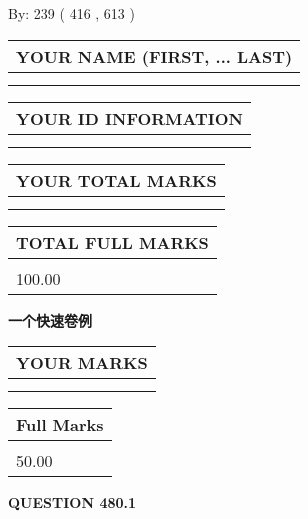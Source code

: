 \documentclass{ctexart}
\begin{document}
   
\hspace{1.0in} By: 
 239 ( 416 ,  613 )
   
   
   
   
\newpage 
\setcounter{page}{ 
   480001 } 
   
   
   
   
\noindent\begin{tabular}{|l|}
\hline
YOUR NAME (FIRST, ... LAST)  \\
\hline
 \\ 
 \\ 
\hline
\end{tabular}
\hspace{0.05in} \begin{tabular}{|l|}
\hline
 YOUR   ID   INFORMATION  \\
\hline
 \\ 
 \\ 
\hline
\end{tabular}
   
   
\vspace{0.2in}\noindent\begin{tabular}{|l|}
\hline
YOUR TOTAL MARKS  \\
\hline
 \\ 
 \\ 
\hline
\end{tabular}
\hspace{0.05in} \begin{tabular}{|l|}
\hline
TOTAL FULL MARKS  \\
\hline
 \\ 
100.00 \\
\hline
\end{tabular}
   
   
 \vspace{0.2in}
{\LARGE {\textbf{ 一个快速卷例}}}
   
   
  
\vspace{0.2in}
  
\noindent\begin{tabular}{|l|}
\hline
 YOUR MARKS  \\
\hline
 \\ 
 \\ 
\hline
\end{tabular}
\hspace{0.05in} \begin{tabular}{|l|}
\hline
 Full Marks  \\
\hline
 \\ 
50.00 \\
\hline
\end{tabular}
{\textbf{\Large{QUESTION
480.1 
}}}
  
\end{document}
